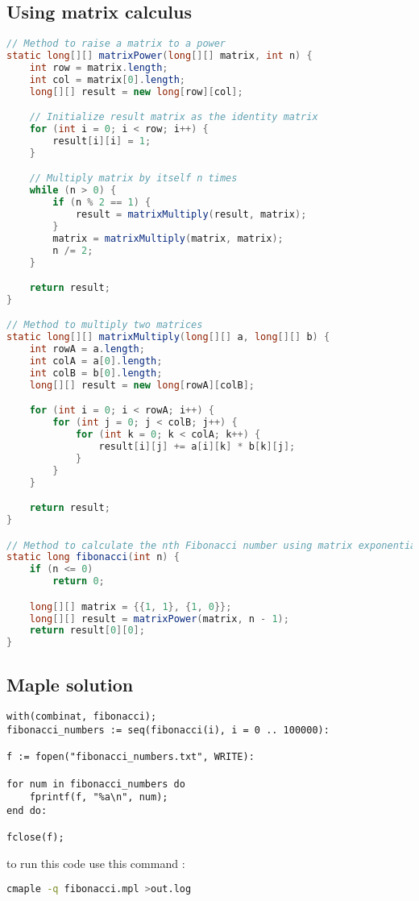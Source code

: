 \documentclass{article}
\begin{document}
\subsection{Using matrix calculus}
\newpage
\begin{lstlisting}[language=Java]
// Method to raise a matrix to a power
static long[][] matrixPower(long[][] matrix, int n) {
	int row = matrix.length;
	int col = matrix[0].length;
	long[][] result = new long[row][col];

	// Initialize result matrix as the identity matrix
	for (int i = 0; i < row; i++) {
		result[i][i] = 1;
	}

	// Multiply matrix by itself n times
	while (n > 0) {
		if (n % 2 == 1) {
			result = matrixMultiply(result, matrix);
		}
		matrix = matrixMultiply(matrix, matrix);
		n /= 2;
	}

	return result;
}

// Method to multiply two matrices
static long[][] matrixMultiply(long[][] a, long[][] b) {
	int rowA = a.length;
	int colA = a[0].length;
	int colB = b[0].length;
	long[][] result = new long[rowA][colB];

	for (int i = 0; i < rowA; i++) {
		for (int j = 0; j < colB; j++) {
			for (int k = 0; k < colA; k++) {
				result[i][j] += a[i][k] * b[k][j];
			}
		}
	}

	return result;
}

// Method to calculate the nth Fibonacci number using matrix exponentiation
static long fibonacci(int n) {
	if (n <= 0)
		return 0;

	long[][] matrix = {{1, 1}, {1, 0}};
	long[][] result = matrixPower(matrix, n - 1);
	return result[0][0];
}
\end{lstlisting}


\subsection{Maple solution}
\begin{lstlisting}[language=Maple]
with(combinat, fibonacci);
fibonacci_numbers := seq(fibonacci(i), i = 0 .. 100000):

f := fopen("fibonacci_numbers.txt", WRITE):

for num in fibonacci_numbers do
	fprintf(f, "%a\n", num);
end do:

fclose(f);
\end{lstlisting}

to run this code use this command :
\begin{lstlisting}[language=bash]
cmaple -q fibonacci.mpl >out.log
\end{lstlisting}
\end{document}
